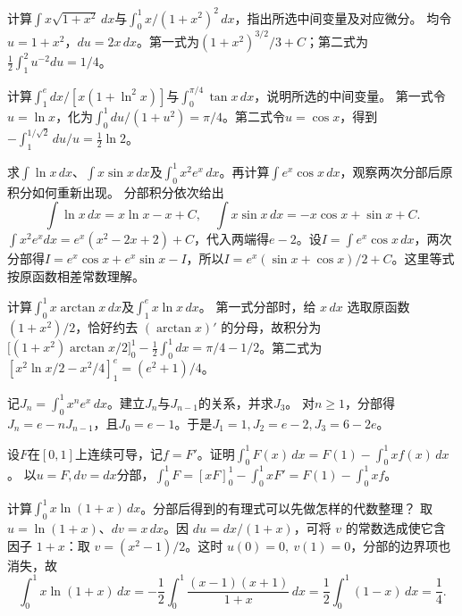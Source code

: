 计算\(\int x\sqrt{1+x^2}\,dx\)与\(\int_0^1x/(1+x^2)^2\,dx\)，指出所选中间变量及对应微分。
\solutionanswer
均令\(u=1+x^2\)，\(du=2x\,dx\)。第一式为\((1+x^2)^{3/2}/3+C\)；第二式为\(\tfrac12\int_1^2u^{-2}du=1/4\)。


计算\(\int_1^e dx/[x(1+\ln^2x)]\)与\(\int_0^{\pi/4}\tan x\,dx\)，说明所选的中间变量。
\solutionanswer
第一式令\(u=\ln x\)，化为\(\int_0^1du/(1+u^2)=\pi/4\)。第二式令\(u=\cos x\)，得到\(-\int_1^{1/\sqrt2}du/u=\frac12\ln2\)。


求\(\int\ln x\,dx\)、\(\int x\sin x\,dx\)及\(\int_0^1 x^2e^x\,dx\)。再计算\(\int e^x\cos x\,dx\)，观察两次分部后原积分如何重新出现。
\solutionanswer
分部积分依次给出
\[
 \int\ln x\,dx=x\ln x-x+C,\quad
 \int x\sin x\,dx=-x\cos x+\sin x+C.
\]
\(\int x^2e^x dx=e^x(x^2-2x+2)+C\)，代入两端得\(e-2\)。设\(I=\int e^x\cos x\,dx\)，两次分部得\(I=e^x\cos x+e^x\sin x-I\)，所以\(I=e^x(\sin x+\cos x)/2+C\)。这里等式按原函数相差常数理解。


计算\(\int_0^1x\arctan x\,dx\)及\(\int_1^e x\ln x\,dx\)。
\solutionanswer
第一式分部时，给 \(x\,dx\) 选取原函数 \((1+x^2)/2\)，恰好约去 \((\arctan x)'\) 的分母，故积分为 \(\bigl[(1+x^2)\arctan x/2\bigr]_0^1-\tfrac12\int_0^1dx=\pi/4-1/2\)。第二式为 \([x^2\ln x/2-x^2/4]_1^e=(e^2+1)/4\)。


记\(J_n=\int_0^1x^ne^x\,dx\)。建立\(J_n\)与\(J_{n-1}\)的关系，并求\(J_3\)。
\solutionanswer
对\(n\ge1\)，分部得\(J_n=e-nJ_{n-1}\)，且\(J_0=e-1\)。于是\(J_1=1,J_2=e-2,J_3=6-2e\)。


设\(F\)在\([0,1]\)上连续可导，记\(f=F'\)。证明\(\int_0^1F(x)\,dx=F(1)-\int_0^1xf(x)\,dx\)。
\solutionanswer
以\(u=F,dv=dx\)分部，\(\int_0^1F=[xF]_0^1-\int_0^1xF'=F(1)-\int_0^1xf\)。


计算\(\int_0^1x\ln(1+x)\,dx\)。分部后得到的有理式可以先做怎样的代数整理？
\solutionanswer
取 \(u=\ln(1+x)\)、\(dv=x\,dx\)。因 \(du=dx/(1+x)\)，可将 \(v\) 的常数选成使它含因子 \(1+x\)：取 \(v=(x^2-1)/2\)。这时 \(u(0)=0,\ v(1)=0\)，分部的边界项也消失，故
\[
 \int_0^1 x\ln(1+x)\,dx
 =-\frac12\int_0^1\frac{(x-1)(x+1)}{1+x}\,dx
 =\frac12\int_0^1(1-x)\,dx=\frac14 .
\]


